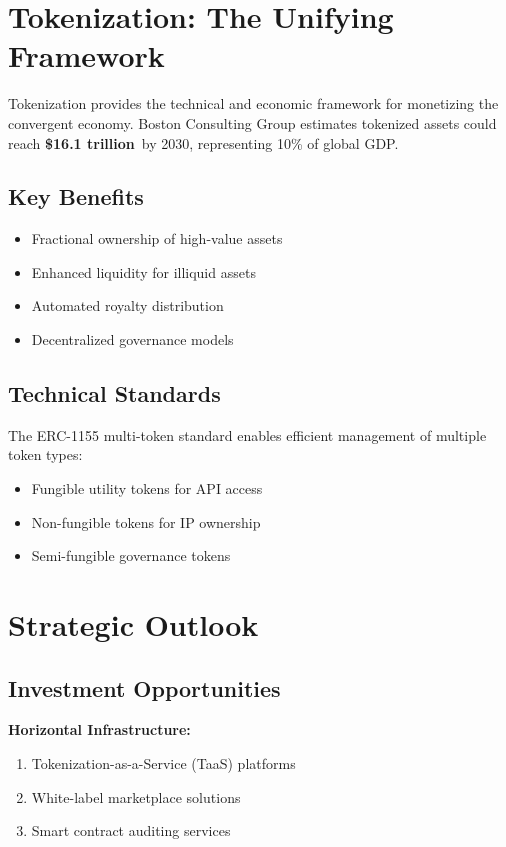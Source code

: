 \documentclass[11pt,a4paper]{report}
\newcommand{\marketvalue}[2]{\textcolor{accentgreen}{\textbf{\$#1}}\,\textcolor{darkgray}{#2}}
\begin{document}
\chapter{Tokenization: The Unifying Framework}

Tokenization provides the technical and economic framework for monetizing the convergent economy. Boston Consulting Group estimates tokenized assets could reach \marketvalue{16.1 trillion}{} by 2030, representing 10\% of global GDP.

\section{Key Benefits}
\begin{itemize}
    \item Fractional ownership of high-value assets
    \item Enhanced liquidity for illiquid assets
    \item Automated royalty distribution
    \item Decentralized governance models
\end{itemize}

\section{Technical Standards}

The ERC-1155 multi-token standard enables efficient management of multiple token types:
\begin{itemize}
    \item Fungible utility tokens for API access
    \item Non-fungible tokens for IP ownership
    \item Semi-fungible governance tokens
\end{itemize}

\chapter{Strategic Outlook}

\section{Investment Opportunities}

\textbf{Horizontal Infrastructure:}
\begin{enumerate}
    \item Tokenization-as-a-Service (TaaS) platforms
    \item White-label marketplace solutions
    \item Smart contract auditing services
\end{enumerate}
\end{document}
